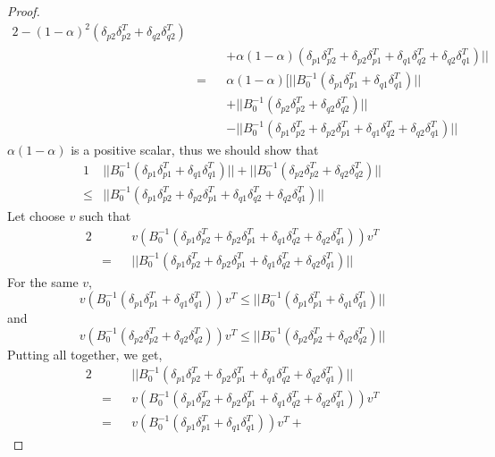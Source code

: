 \documentclass[11pt,twocolumn,varwidth=true,a4paper,fleqn]{article}
\begin{document}
\begin{proof}
\begin{alignat*}{2}
- (1-\alpha)^2(\delta_{p2}\delta_{p2}^T + \delta_{q2}\delta_{q2}^T) \\
& && + \alpha(1-\alpha)(\delta_{p1}\delta_{p2}^T+\delta_{p2}\delta_{p1}^T
+\delta_{q1}\delta_{q2}^T+\delta_{q2}\delta_{q1}^T) || \\
& = && \alpha(1-\alpha)[||B_0^{-1}(\delta_{p1}\delta_{p1}^T +
\delta_{q1}\delta_{q1}^T)||\\
& && +||B_0^{-1}(\delta_{p2}\delta_{p2}^T + \delta_{q2}\delta_{q2}^T)|| \\
& && -||B_0^{-1}(\delta_{p1}\delta_{p2}^T+\delta_{p2}\delta_{p1}^T
+\delta_{q1}\delta_{q2}^T+\delta_{q2}\delta_{q1}^T)||
\end{alignat*}
$\alpha(1-\alpha)$ is a positive scalar, thus we should show that
\begin{alignat*}{1}
& ||B_0^{-1}(\delta_{p1}\delta_{p1}^T + \delta_{q1}\delta_{q1}^T)|| +
||B_0^{-1}(\delta_{p2}\delta_{p2}^T + \delta_{q2}\delta_{q2}^T)|| \\
\leq &  ||B_0^{-1}(\delta_{p1}\delta_{p2}^T+\delta_{p2}\delta_{p1}^T
+\delta_{q1}\delta_{q2}^T+\delta_{q2}\delta_{q1}^T)||
\end{alignat*}
Let choose $v$ such that
\begin{alignat*}{2}
& && v(B_0^{-1}(\delta_{p1}\delta_{p2}^T+\delta_{p2}\delta_{p1}^T +\delta_{q1}\delta_{q2}^T+\delta_{q2}\delta_{q1}^T))v^T \\
& = &&||B_0^{-1}(\delta_{p1}\delta_{p2}^T+\delta_{p2}\delta_{p1}^T +\delta_{q1}\delta_{q2}^T+\delta_{q2}\delta_{q1}^T)||
\end{alignat*}
For the same $v$,
\begin{equation*}
 v(B_0^{-1}(\delta_{p1}\delta_{p1}^T + \delta_{q1}\delta_{q1}^T))v^T
 \leq ||B_0^{-1}(\delta_{p1}\delta_{p1}^T + \delta_{q1}\delta_{q1}^T)||
\end{equation*}
and
\begin{equation*}
 v(B_0^{-1}(\delta_{p2}\delta_{p2}^T + \delta_{q2}\delta_{q2}^T))v^T
 \leq ||B_0^{-1}(\delta_{p2}\delta_{p2}^T + \delta_{q2}\delta_{q2}^T)||
\end{equation*}
Putting all together, we get,
\begin{alignat*}{2}
& &&||B_0^{-1}(\delta_{p1}\delta_{p2}^T+\delta_{p2}\delta_{p1}^T
+\delta_{q1}\delta_{q2}^T+\delta_{q2}\delta_{q1}^T)|| \\
& = && v(B_0^{-1}(\delta_{p1}\delta_{p2}^T+\delta_{p2}\delta_{p1}^T +\delta_{q1}\delta_{q2}^T+\delta_{q2}\delta_{q1}^T))v^T \\
& = && v(B_0^{-1}(\delta_{p1}\delta_{p1}^T + \delta_{q1}\delta_{q1}^T))v^T +

\end{alignat*}
\end{proof}
\end{document}
